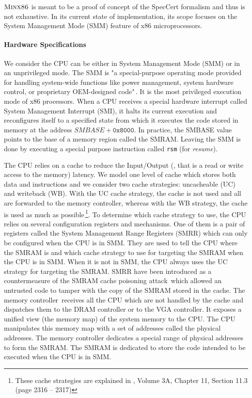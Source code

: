 $\textsc{Minx86}$ is meant to be a proof of concept of the SpecCert formalism
and thus is not exhaustive. In its current state of implementation, its scope
focuses on the System Management Mode (SMM) feature of x86 microprocessors.

\paragraph{Hardware Specifications}
We consider the CPU can be either in System Management Mode (SMM) or in an
unprivileged mode. The SMM is "a special-purpose operating mode provided for
handling system-wide functions like power management, system hardware control,
or proprietary OEM-designed code"\,\cite{intel2014manual}. It is the most
privileged execution mode of x86 processors.  When a CPU receives a special
hardware interrupt called System Management Interrupt (SMI), it halts its
current execution and reconfigures itself to a specified state from which it
executes the code stored in memory at the address $SMBASE + \texttt{0x8000}$. In
practice, the SMBASE value points to the base of a memory region called the
SMRAM. Leaving the SMM is done by executing a special purpose instruction called
\texttt{rsm} (for \emph{resume}).

The CPU relies on a cache to reduce the Input/Output (\IO, that is a read or
write access to the memory) latency. We model one level of cache which stores
both data and instructions and we consider two cache strategies: uncacheable
(UC) and writeback (WB). With the UC cache strategy, the cache is not used and
all \IOs are forwarded to the memory controller, whereas with the WB strategy,
the cache is used as much as possible\,\footnote{These cache strategies are
  explained in \cite{intel2014manual}, Volume 3A, Chapter 11, Section 11.3 (page
  2316 -- 2317)}. To determine which cache strategy to use, the CPU relies on
several configuration registers and mechanisms. One of them is a pair of
registers called the System Management Range Registers (SMRR) which can only be
configured when the CPU is in SMM. They are used to tell the CPU where the SMRAM
is and which cache strategy to use for \IO targeting the SMRAM when the CPU is
in SMM.  When it is not in SMM, the CPU always uses the UC strategy for \IO
targeting the SMRAM. SMRR have been introduced as a countermeasure of the SMRAM
cache poisoning attack\,\cite{wojtczuk2009smram,duflot2009smram} which allowed
an untrusted code to tamper with the copy of the SMRAM stored in the cache.  The
memory controller\,\cite{intel2009mch} receives all the CPU \IOs which are not
handled by the cache and dispatches them to the DRAM controller or to the VGA
controller. It exposes a unified view (the memory map) of the system memory to
the CPU. The CPU manipulates this memory map with a set of addresses called the
physical addresses. The memory controller dedicates a special range of physical
addresses to form the SMRAM. The SMRAM is dedicated to store the code intended
to be executed when the CPU is in SMM.

